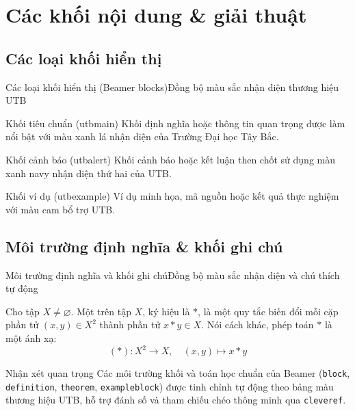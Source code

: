 \documentclass[aspectratio=169,10pt]{beamer}
\begin{document}
\section[Giải thuật]{Các khối nội dung \& giải thuật}
\subsection{Các loại khối hiển thị}
\begin{frame}{Các loại khối hiển thị (Beamer blocks)}{Đồng bộ màu sắc nhận diện thương hiệu UTB}
  \begin{block}{Khối tiêu chuẩn (utbmain)}
    Khối định nghĩa hoặc thông tin quan trọng được làm nổi bật với màu xanh lá nhận diện của Trường Đại học Tây Bắc.
  \end{block}

  \begin{alertblock}{Khối cảnh báo (utbalert)}
    Khối cảnh báo hoặc kết luận then chốt sử dụng màu xanh navy nhận diện thứ hai của UTB.
  \end{alertblock}

  \begin{exampleblock}{Khối ví dụ (utbexample)}
    Ví dụ minh họa, mã nguồn hoặc kết quả thực nghiệm với màu cam bổ trợ UTB.
  \end{exampleblock}
\end{frame}

\subsection{Môi trường định nghĩa \& khối ghi chú}
\begin{frame}{Môi trường định nghĩa và khối ghi chú}{Đồng bộ màu sắc nhận diện và chú thích tự động}
  \begin{definition}
    Cho tập $X \neq \varnothing$. Một  trên tập $X$, ký hiệu là $*$, là một quy tắc biến đổi mỗi cặp phần tử $(x, y) \in X^2$ thành phần tử $x * y \in X$. Nói cách khác, phép toán $*$ là một ánh xạ:
    \[
      (*) : X^2 \longrightarrow X, \quad (x, y) \longmapsto x * y
    \]
  \end{definition}

  \begin{exampleblock}{Nhận xét quan trọng}
    \warning Các môi trường khối và toán học chuẩn của Beamer (\texttt{block}, \texttt{definition}, \texttt{theorem}, \texttt{exampleblock}) được tinh chỉnh tự động theo bảng màu thương hiệu UTB, hỗ trợ đánh số và tham chiếu chéo thông minh qua \texttt{cleveref}.
  \end{exampleblock}
\end{frame}
\end{document}
